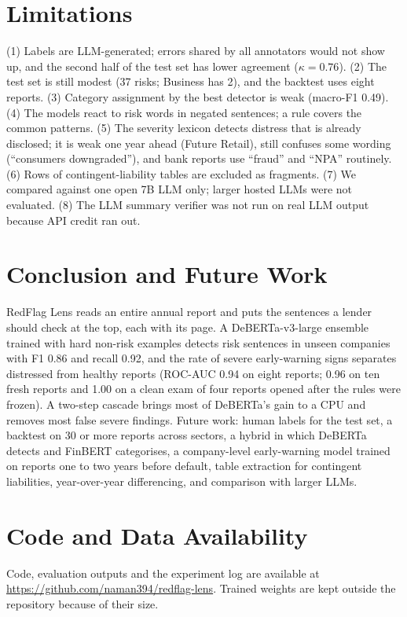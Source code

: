 \documentclass[conference]{IEEEtran}
\begin{document}
\section{Limitations}
(1) Labels are LLM-generated; errors shared by all annotators would not show up, and the second half of the test set has lower agreement ($\kappa=0.76$). (2) The test set is still modest (37 risks; Business has 2), and the backtest uses eight reports. (3) Category assignment by the best detector is weak (macro-F1 0.49). (4) The models react to risk words in negated sentences; a rule covers the common patterns. (5) The severity lexicon detects distress that is already disclosed; it is weak one year ahead (Future Retail), still confuses some wording (``consumers downgraded''), and bank reports use ``fraud'' and ``NPA'' routinely. (6) Rows of contingent-liability tables are excluded as fragments. (7) We compared against one open 7B LLM only; larger hosted LLMs were not evaluated. (8) The LLM summary verifier was not run on real LLM output because API credit ran out.

\section{Conclusion and Future Work}
RedFlag Lens reads an entire annual report and puts the sentences a lender should check at the top, each with its page. A DeBERTa-v3-large ensemble trained with hard non-risk examples detects risk sentences in unseen companies with F1 0.86 and recall 0.92, and the rate of severe early-warning signs separates distressed from healthy reports (ROC-AUC 0.94 on eight reports; 0.96 on ten fresh reports and 1.00 on a clean exam of four reports opened after the rules were frozen). A two-step cascade brings most of DeBERTa's gain to a CPU and removes most false severe findings. Future work: human labels for the test set, a backtest on 30 or more reports across sectors, a hybrid in which DeBERTa detects and FinBERT categorises, a company-level early-warning model trained on reports one to two years before default, table extraction for contingent liabilities, year-over-year differencing, and comparison with larger LLMs.

\section*{Code and Data Availability}
Code, evaluation outputs and the experiment log are available at \url{https://github.com/naman394/redflag-lens}. Trained weights are kept outside the repository because of their size.
\end{document}
